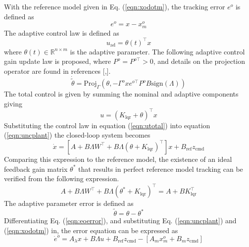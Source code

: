 \documentclass[]{../sty/aiaa-tc}
\begin{document}
  With the reference model given in Eq. (\ref{eqn:xodotm}), the tracking error $e^{o}$ is defined as
  \begin{equation}
    \label{eqn:eoerror}
    e^{o}=x-x_{m}^{o}
  \end{equation}
  The adaptive control law is defined as
  \begin{equation}
    \label{eqn:uadporm}
    u_{\text{ad}}=\theta(t)^{\top}x
  \end{equation}
  where $\theta(t) \in \mathbb{R}^{n\times m}$ is the adaptive parameter.
  The following adaptive control gain update law is proposed, where $P^{o}=P^{o\top}>0$, and details on the projection operator are found in references [,].
  \begin{equation}
    \label{eqn:ormupdatelaw}
    \dot{\tilde{\theta}}=\text{Proj}_{\Gamma}(\theta,-\Gamma^{o} xe^{o\top}P^{o}B\text{sign}(\Lambda))
  \end{equation}
  The total control is given by summing the nominal and adaptive components giving
  \begin{equation}
    \label{eqn:utotal}
    u=(K_{\text{lqr}}+\theta)^{\top}x
  \end{equation}
  Substituting the control law in equation (\ref{eqn:utotal}) into equation (\ref{eqn:uncplant}) the closed-loop system becomes
  \begin{equation*}
    \dot{x}=\left[A+B\Lambda W^{\top}+B\Lambda(\theta+K_{\text{lqr}})^{\top}\right]x+B_{\text{ref}}z_{\text{cmd}}
  \end{equation*}
  Comparing this expression to the reference model, the existence of an ideal feedback gain matrix $\theta^{*}$ that results in perfect reference model tracking can be verified from the following expression.
  \begin{equation}
    \label{eqn:matchingcondition}
    A+B\Lambda W^{\top}+B\Lambda(\theta^{*}+K_{\text{lqr}})^{\top}=A+BK_{\text{lqr}}^{\top}
  \end{equation}
  The adaptive parameter error is defined as
  \begin{equation}
    \tilde{\theta}=\theta-\theta^{*}
  \end{equation}
  Differentiating Eq. (\ref{eqn:eoerror}), and substituting Eq. (\ref{eqn:uncplant}) and (\ref{eqn:xodotm}) in, the error equation can be expressed as
  \begin{equation*}
    \dot{e}^{o}=A_{\lambda}x+B\Lambda u+B_{\text{ref}}z_{\text{cmd}}-[A_{m}x_{m}^{o}+B_{m}z_{\text{cmd}}]
  \end{equation*}
\end{document}
